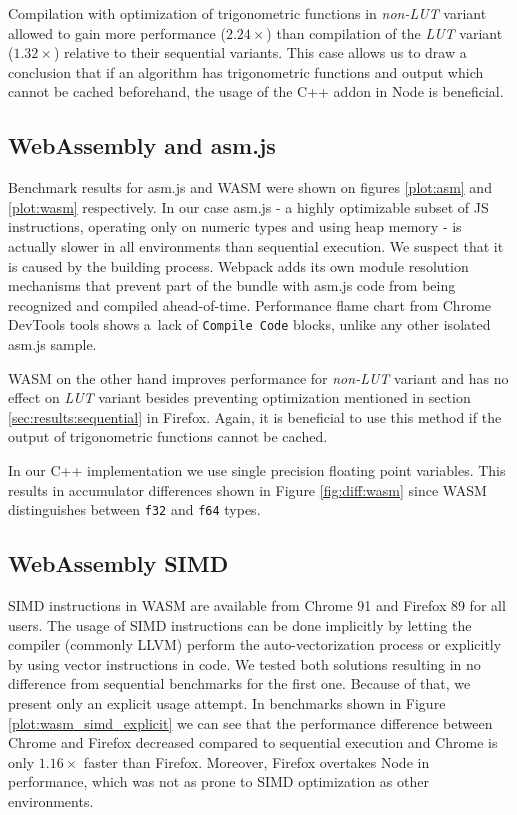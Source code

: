 
Compilation with optimization of trigonometric functions in \textit{non-LUT} variant allowed to gain more performance ($2.24\times$) than compilation of the \textit{LUT} variant ($1.32\times$) relative to their sequential variants. This case allows us to draw a conclusion that if an algorithm has trigonometric functions and output which cannot be cached beforehand, the usage of the C++ addon in Node is beneficial.

\subsection{WebAssembly and asm.js}\label{sec:results:asm-wasm}

Benchmark results for asm.js and WASM were shown on figures \ref{plot:asm} and \ref{plot:wasm} respectively. In our case asm.js - a highly optimizable subset of JS instructions, operating only on numeric types and using heap memory - is actually slower in all environments than sequential execution. We suspect that it is caused by the building process. Webpack adds its own module resolution mechanisms that prevent part of the bundle with asm.js code from being recognized and compiled ahead-of-time. Performance flame chart from Chrome DevTools tools shows a~lack of \texttt{Compile Code} blocks, unlike any other isolated asm.js sample.

WASM on the other hand improves performance for \textit{non-LUT} variant and has no effect on \textit{LUT} variant besides preventing optimization mentioned in section \ref{sec:results:sequential} in Firefox. Again, it is beneficial to use this method if the output of trigonometric functions cannot be cached.

In our C++ implementation we use single precision floating point variables. This results in accumulator differences shown in Figure \ref{fig:diff:wasm} since WASM distinguishes between \texttt{f32} and \texttt{f64} types.






\subsection{WebAssembly SIMD}

SIMD instructions in WASM are available from Chrome 91 and Firefox 89 for all users. The usage of SIMD instructions can be done implicitly by letting the compiler (commonly LLVM) perform the auto-vectorization process or explicitly by using vector instructions in code. We tested both solutions resulting in no difference from sequential benchmarks for the first one. Because of that, we present only an explicit usage attempt. In benchmarks shown in Figure \ref{plot:wasm_simd_explicit} we can see that the performance difference between Chrome and Firefox decreased compared to sequential execution and Chrome is only $1.16\times$ faster than Firefox. Moreover, Firefox overtakes Node in performance, which was not as prone to SIMD optimization as other environments.

